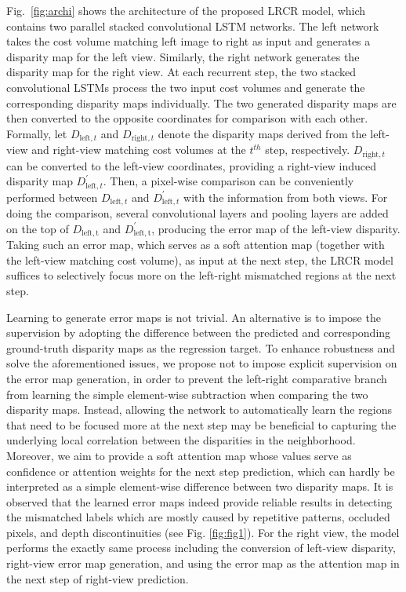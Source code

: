 \documentclass[10pt,twocolumn,letterpaper]{article}
\begin{document}
Fig.~\ref{fig:archi} shows the architecture of the proposed LRCR model, which contains two parallel stacked convolutional LSTM networks. The left network takes the cost volume matching left image to right as input and generates a disparity map for the left view. Similarly, the right network generates the disparity map for the right view. At each recurrent step, the two stacked convolutional LSTMs process the two input cost volumes and generate the corresponding disparity maps individually. The two generated disparity maps are then converted to the opposite coordinates \cite{seki2016patch} for comparison with each other. Formally, let $D_{\mathrm{left}, t}$  and $D_{\mathrm{right}, t}$ denote the disparity maps derived from the left-view and  right-view matching cost volumes at the $t^{th}$ step, respectively.   $D_{\mathrm{right}, t}$  can be converted to the left-view coordinates, providing a right-view induced   disparity map $D_{\mathrm{left}, t}^{\prime}$.  Then,  a pixel-wise comparison can be conveniently performed between $D_{\mathrm{left}, t}$ and $D_{\mathrm{left}, t}^{\prime}$ with the information from both views. For doing the comparison,  several convolutional layers and pooling layers are added on the top of  $D_{\mathrm{left, t}}$ and $D_{\mathrm{left, t}}^{\prime}$, producing  the error map of the left-view disparity. Taking such an error map, which serves as a soft attention map (together with the left-view matching cost volume), as  input at the next step, the LRCR model suffices  to selectively focus more on the left-right mismatched  regions at the next step. 



Learning to generate error maps is not trivial. An alternative is to impose the supervision by adopting the difference between the predicted and corresponding ground-truth disparity maps as the regression target. To enhance robustness and solve the aforementioned issues,  we propose  not to  impose  explicit supervision on the error map generation, in order to prevent the left-right comparative branch from learning the simple element-wise subtraction when comparing the two disparity maps. Instead, allowing the network to automatically learn the regions that need to be focused more at the next step may be beneficial to capturing the underlying local correlation between the disparities in the neighborhood. Moreover, we aim to provide a soft attention map whose values serve as confidence or attention weights for the next step prediction, which can hardly be interpreted as a simple element-wise difference between two disparity maps. It is observed that the learned error maps indeed provide reliable results in detecting the mismatched labels which are mostly caused by repetitive patterns, occluded pixels, and depth discontinuities (see Fig. \ref{fig:fig1}). For the right view, the model performs the exactly same process including the conversion of left-view disparity, right-view error map generation, and using the error map as the attention map in the next step of right-view prediction.
\end{document}
